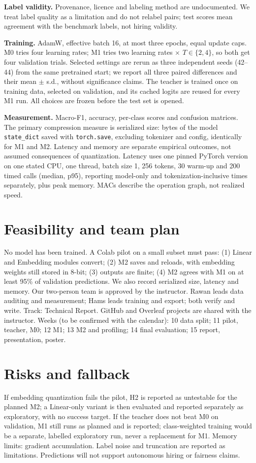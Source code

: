 \documentclass[11pt]{article}
\begin{document}
\textbf{Label validity.} Provenance, licence and labeling method are undocumented. We treat label quality as a limitation and do not relabel pairs; test scores mean agreement with the benchmark labels, not hiring validity.

\textbf{Training.} AdamW, effective batch 16, at most three epochs, equal update caps. M0 tries four learning rates; M1 tries two learning rates $\times$ $T\in\{2,4\}$, so both get four validation trials. Selected settings are rerun as three independent seeds (42--44) from the same pretrained start; we report all three paired differences and their mean $\pm$ s.d., without significance claims. The teacher is trained once on training data, selected on validation, and its cached logits are reused for every M1 run. All choices are frozen before the test set is opened.

\textbf{Measurement.} Macro-F1, accuracy, per-class scores and confusion matrices. The primary compression measure is serialized size: bytes of the model \texttt{state\_dict} saved with \texttt{torch.save}, excluding tokenizer and config, identically for M1 and M2. Latency and memory are separate empirical outcomes, not assumed consequences of quantization. Latency uses one pinned PyTorch version on one stated CPU, one thread, batch size 1, 256 tokens, 30 warm-up and 200 timed calls (median, p95), reporting model-only and tokenization-inclusive times separately, plus peak memory. MACs describe the operation graph, not realized speed.

\section{Feasibility and team plan}
No model has been trained. A Colab pilot on a small subset must pass: (1) Linear and Embedding modules convert; (2) M2 saves and reloads, with embedding weights still stored in 8-bit; (3) outputs are finite; (4) M2 agrees with M1 on at least 95\% of validation predictions. We also record serialized size, latency and memory. Our two-person team is approved by the instructor. Rawan leads data auditing and measurement; Hams leads training and export; both verify and write. Track: Technical Report. GitHub and Overleaf projects are shared with the instructor. Weeks (to be confirmed with the calendar): 10 data split; 11 pilot, teacher, M0; 12 M1; 13 M2 and profiling; 14 final evaluation; 15 report, presentation, poster.

\section{Risks and fallback}
If embedding quantization fails the pilot, H2 is reported as untestable for the planned M2; a Linear-only variant is then evaluated and reported separately as exploratory, with no success target. If the teacher does not beat M0 on validation, M1 still runs as planned and is reported; class-weighted training would be a separate, labelled exploratory run, never a replacement for M1. Memory limits: gradient accumulation. Label noise and truncation are reported as limitations. Predictions will not support autonomous hiring or fairness claims.
\end{document}
